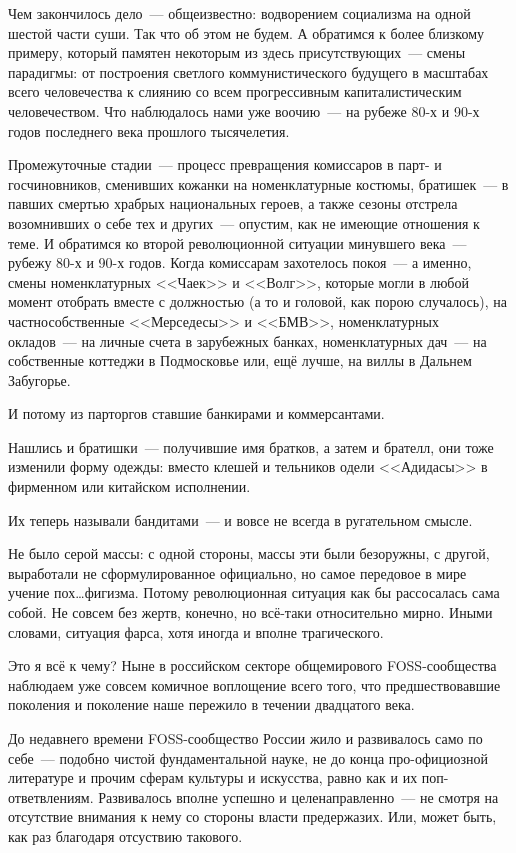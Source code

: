 Чем закончилось дело~--- общеизвестно: водворением социализма на одной шестой части суши. Так что об этом не будем. А обратимся к более близкому примеру, который памятен некоторым из здесь присутствующих~--- смены парадигмы: от построения светлого коммунистического будущего в масштабах всего человечества к слиянию со всем прогрессивным капиталистическим человечеством. Что наблюдалось нами уже воочию~--- на рубеже 80-х и 90-х годов последнего века прошлого тысячелетия.

Промежуточные стадии~--- процесс превращения комиссаров в парт- и госчиновников, сменивших кожанки на номенклатурные костюмы, братишек~--- в павших смертью храбрых национальных героев, а также сезоны отстрела возомнивших о себе тех и других~--- опустим, как не имеющие отношения к теме. И обратимся ко второй революционной ситуации минувшего века~--- рубежу 80-х и 90-х годов. Когда комиссарам захотелось покоя~--- а именно, смены номенклатурных <<Чаек>> и <<Волг>>, которые могли в любой момент отобрать вместе с должностью (а то и головой, как порою случалось), на частнособственные <<Мерседесы>> и <<БМВ>>, номенклатурных окладов~--- на личные счета в зарубежных банках, номенклатурных дач~--- на собственные коттеджи в Подмосковье или, ещё лучше, на виллы в Дальнем Забугорье.

И потому из парторгов ставшие банкирами и коммерсантами.

Нашлись и братишки~--- получившие имя братков, а затем и брателл, они тоже изменили форму одежды: вместо клешей и тельников одели <<Адидасы>> в фирменном или китайском исполнении.

Их теперь называли бандитами~--- и вовсе не всегда в ругательном смысле.

Не было серой массы: с одной стороны, массы эти были безоружны, с другой, выработали не сформулированное официально, но самое передовое в мире учение пох\dots фигизма. Потому революционная ситуация как бы рассосалась сама собой. Не совсем без жертв, конечно, но всё-таки относительно мирно. Иными словами, ситуация фарса, хотя иногда и вполне трагического.

Это я всё к чему? Ныне в российском секторе общемирового FOSS-сообщества наблюдаем уже совсем комичное воплощение всего того, что предшествовавшие поколения и поколение наше пережило в течении двадцатого века.

До недавнего времени FOSS-сообщество России жило и развивалось само по себе~--- подобно чистой фундаментальной науке, не до конца про-официозной литературе и прочим сферам культуры и искусства, равно как и их поп-ответвлениям. Развивалось вполне успешно и целенаправленно~--- не смотря на отсутствие внимания к нему со стороны власти предержазих. Или, может быть, как раз благодаря отсуствию такового.

